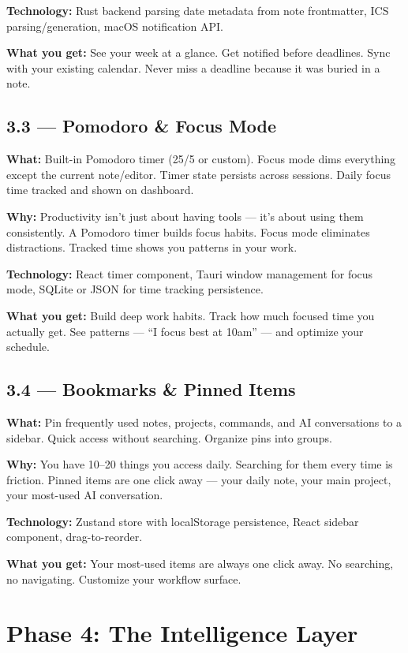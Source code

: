 \documentclass[11pt,a4paper]{article}
\begin{document}
\textbf{Technology:} Rust backend parsing date metadata from note frontmatter, ICS parsing/generation, macOS notification API.

\textbf{What you get:} See your week at a glance. Get notified before deadlines. Sync with your existing calendar. Never miss a deadline because it was buried in a note.

\subsection{3.3 --- Pomodoro \& Focus Mode}

\textbf{What:} Built-in Pomodoro timer (25/5 or custom). Focus mode dims everything except the current note/editor. Timer state persists across sessions. Daily focus time tracked and shown on dashboard.

\textbf{Why:} Productivity isn't just about having tools --- it's about using them consistently. A Pomodoro timer builds focus habits. Focus mode eliminates distractions. Tracked time shows you patterns in your work.

\textbf{Technology:} React timer component, Tauri window management for focus mode, SQLite or JSON for time tracking persistence.

\textbf{What you get:} Build deep work habits. Track how much focused time you actually get. See patterns --- ``I focus best at 10am'' --- and optimize your schedule.

\subsection{3.4 --- Bookmarks \& Pinned Items}

\textbf{What:} Pin frequently used notes, projects, commands, and AI conversations to a sidebar. Quick access without searching. Organize pins into groups.

\textbf{Why:} You have 10--20 things you access daily. Searching for them every time is friction. Pinned items are one click away --- your daily note, your main project, your most-used AI conversation.

\textbf{Technology:} Zustand store with localStorage persistence, React sidebar component, drag-to-reorder.

\textbf{What you get:} Your most-used items are always one click away. No searching, no navigating. Customize your workflow surface.

\section{Phase 4: The Intelligence Layer}
\end{document}
